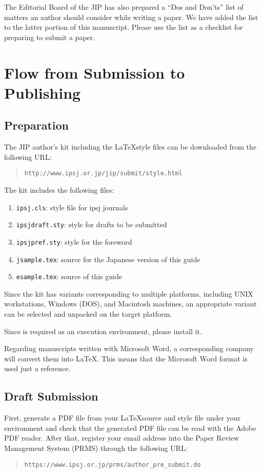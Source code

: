 \documentclass[JIP]{ipsj}
\def\|{\verb|}
\begin{document}
The Editorial Board of the JIP has also prepared a ``Dos and Don'ts''
list of matters an author should consider while writing a paper.  We
have added the list to the latter portion of this manuscript.  Please
use the list as a checklist for preparing to submit a paper.

%2
\section{Flow from Submission to Publishing}
%2.1
\subsection{Preparation}

The JIP author's kit including the \LaTeX style files can be downloaded
from the following URL:
\begin{quote}
 \small
 \|http://www.ipsj.or.jp/jip/submit/style.html|
\end{quote}
The kit includes the following files:
\begin{enumerate}%
\item \|ipsj.cls|: style file for ipsj journals
\item \|ipsjdraft.sty|: style for drafts to be submitted
\item \|ipsjpref.sty|: style for the foreword
\item \|jsample.tex|: source for the Japanese version of this guide
\item \|esample.tex|: source of this guide
\end{enumerate}%

Since the kit has variants corresponding to multiple platforms,
including UNIX workstations, Windows (DOS), and Macintosh machines, an
appropriate variant can be selected and unpacked on the target
platform. 

Since {\LaTeXe} is required as an execution environment, please install
it.

Regarding manuscripts written with Microsoft Word, a corresponding
company will convert them into \LaTeX\@.  This means that the Microsoft
Word format is used just a reference.



\subsection{Draft Submission}

First, generate a PDF file from your \LaTeX source and style file under
your {\LaTeXe} environment and check that the generated PDF file can be
read with the Adobe PDF reader.  After that, register your email address
into the Paper Review Management System (PRMS) through the following
URL:
\begin{quote}
 \small
 \|https://www.ipsj.or.jp/prms/author_pre_submit.do|
\end{quote}
\end{document}

